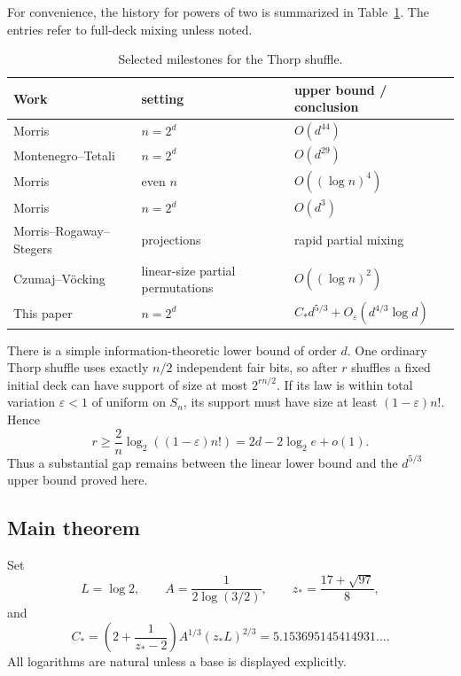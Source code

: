 \documentclass[11pt]{article}
\numberwithin{equation}{section}
\theoremstyle{definition}\newtheorem{definition}[theorem]{Definition}
\theoremstyle{remark}\newtheorem{remark}[theorem]{Remark}
\begin{document}
For convenience, the history for powers of two is summarized in
Table~\ref{tab:history}.  The entries refer to full-deck mixing unless noted.
\begin{table}[ht]
\centering
\begin{tabular}{lll}
\toprule
Work & setting & upper bound / conclusion \\
\midrule
Morris \cite{Morris2008} & $n=2^d$ & $O(d^{44})$ \\
Montenegro--Tetali \cite{MontenegroTetali2006} & $n=2^d$ & $O(d^{29})$ \\
Morris \cite{Morris2009AOP} & even $n$ & $O((\log n)^4)$ \\
Morris \cite{Morris2013} & $n=2^d$ & $O(d^3)$ \\
Morris--Rogaway--Stegers \cite{MorrisRogawayStegers2009} & projections & rapid partial mixing \\
Czumaj--V\"ocking \cite{CzumajVoecking2014} & linear-size partial permutations & $O((\log n)^2)$ \\
This paper & $n=2^d$ & $C_*d^{5/3}+O_\varepsilon(d^{4/3}\log d)$ \\
\bottomrule
\end{tabular}
\caption{Selected milestones for the Thorp shuffle.}
\label{tab:history}
\end{table}

There is a simple information-theoretic lower bound of order $d$.  One ordinary
Thorp shuffle uses exactly $n/2$ independent fair bits, so after $r$ shuffles a
fixed initial deck can have support of size at most $2^{rn/2}$.  If its law is
within total variation $\varepsilon<1$ of uniform on $S_n$, its support must
have size at least $(1-\varepsilon)n!$.  Hence
\begin{equation}\label{eq:support-lower}
 r\ge \frac{2}{n}\log_2((1-\varepsilon)n!)
   =2d-2\log_2 e+o(1).
\end{equation}
Thus a substantial gap remains between the linear lower bound and the
$d^{5/3}$ upper bound proved here.

\subsection{Main theorem}
Set
\[
 L=\log 2,\qquad A=\frac1{2\log(3/2)},\qquad
 z_* = \frac{17+\sqrt{97}}8,
\]
and
\begin{equation}\label{eq:Cstar-intro}
 C_*=
 \left(2+\frac1{z_*-2}\right)A^{1/3}(z_*L)^{2/3}
 =5.153695145414931\ldots .
\end{equation}
All logarithms are natural unless a base is displayed explicitly.
\end{document}
